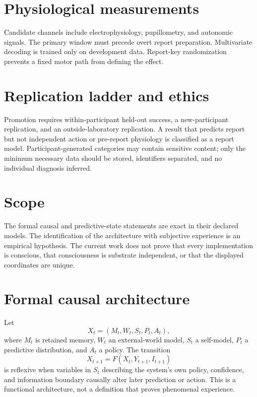 \documentclass[11pt,a4paper]{article}
\begin{document}
\section{Physiological measurements}
Candidate channels include electrophysiology, pupillometry, and autonomic signals. The primary window must precede overt report preparation. Multivariate decoding is trained only on development data. Report-key randomization prevents a fixed motor path from defining the effect.

\section{Replication ladder and ethics}
Promotion requires within-participant held-out success, a new-participant replication, and an outside-laboratory replication. A result that predicts report but not independent action or pre-report physiology is classified as a report model. Participant-generated categories may contain sensitive content; only the minimum necessary data should be stored, identifiers separated, and no individual diagnosis inferred.

\section{Scope}
The formal causal and predictive-state statements are exact in their declared models. The identification of the architecture with subjective experience is an empirical hypothesis. The current work does not prove that every implementation is conscious, that consciousness is substrate independent, or that the displayed coordinates are unique.


\section{Formal causal architecture}
Let
\begin{equation}
X_t=(M_t,W_t,S_t,P_t,A_t),
\end{equation}
where $M_t$ is retained memory, $W_t$ an external-world model, $S_t$ a self-model, $P_t$ a predictive distribution, and $A_t$ a policy. The transition
\begin{equation}
X_{t+1}=F(X_t,Y_{t+1},I_{t+1})
\end{equation}
is reflexive when variables in $S_t$ describing the system's own policy, confidence, and information boundary causally alter later prediction or action. This is a functional architecture, not a definition that proves phenomenal experience.
\end{document}
